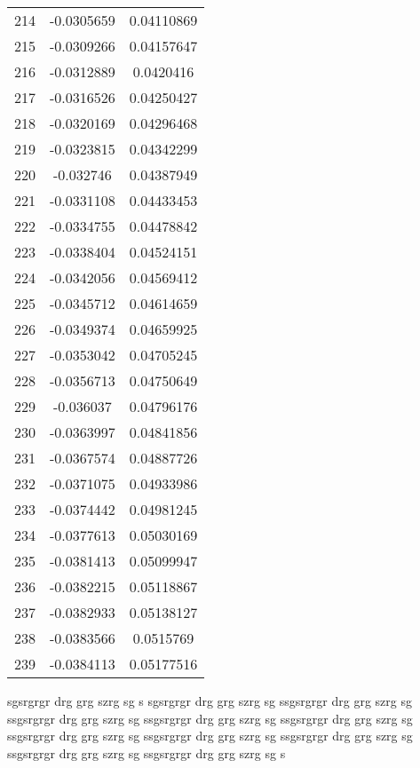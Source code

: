 \documentclass[a4paper, 11pt, oneside]{report}
\begin{document}
{\begin{longtable}{|c|c|c|}
214 & -0.0305659 & 0.04110869 \\
215 & -0.0309266 & 0.04157647 \\
216 & -0.0312889 & 0.0420416  \\
217 & -0.0316526 & 0.04250427 \\
218 & -0.0320169 & 0.04296468 \\
219 & -0.0323815 & 0.04342299 \\
220 & -0.032746  & 0.04387949 \\
221 & -0.0331108 & 0.04433453 \\
222 & -0.0334755 & 0.04478842 \\
223 & -0.0338404 & 0.04524151 \\
224 & -0.0342056 & 0.04569412 \\
225 & -0.0345712 & 0.04614659 \\
226 & -0.0349374 & 0.04659925 \\
227 & -0.0353042 & 0.04705245 \\
228 & -0.0356713 & 0.04750649 \\
229 & -0.036037  & 0.04796176 \\
230 & -0.0363997 & 0.04841856 \\
231 & -0.0367574 & 0.04887726 \\
232 & -0.0371075 & 0.04933986 \\
233 & -0.0374442 & 0.04981245 \\
234 & -0.0377613 & 0.05030169 \\
235 & -0.0381413 & 0.05099947 \\
236 & -0.0382215 & 0.05118867 \\
237 & -0.0382933 & 0.05138127 \\
238 & -0.0383566 & 0.0515769  \\
239 & -0.0384113 & 0.05177516 \\
\hline
\end{longtable}
\unskip
\unpenalty
\unpenalty}

\begin{multicols}{2}
\unvbox\ltmcbox
\end{multicols}

sgsrgrgr drg grg  szrg sg s sgsrgrgr drg grg  szrg sg ssgsrgrgr drg grg  szrg sg ssgsrgrgr drg grg  szrg sg ssgsrgrgr drg grg  szrg sg ssgsrgrgr drg grg  szrg sg ssgsrgrgr drg grg  szrg sg ssgsrgrgr drg grg  szrg sg ssgsrgrgr drg grg  szrg sg ssgsrgrgr drg grg  szrg sg ssgsrgrgr drg grg  szrg sg s
\end{document}
